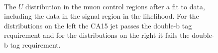 \begin{figure}
  \\
 \caption{The $U$ distribution in the muon control regions after a fit to data, including the data in the signal region in the likelihood. For the distributions on the left the CA15 jet passes the double-b tag requirement and for the distributions on the right it fails the double-b tag requirement.}
\label{Fig_cr_1}
\end{figure}

